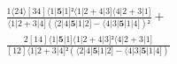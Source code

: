 \documentclass[varwidth, border=5pt]{standalone}
\begin{document}
\begin{my}
$\begin{gathered}
\scriptscriptstyle\frac{1⟨24⟩[34]⟨1|𝟓|1]²⟨1|2+4|3]⟨4|2+3|1]}{⟨1|2+3|4](⟨2|4|𝟓|1|2]-⟨4|3|𝟓|1|4])²} +\\
\scriptscriptstyle\frac{2[14]⟨1|𝟓|1]⟨1|2+4|3]²⟨4|2+3|1]}{[12]⟨1|2+3|4]²(⟨2|4|𝟓|1|2]-⟨4|3|𝟓|1|4])} \phantom{+}
\end{gathered}$
\end{my}
\end{document}
